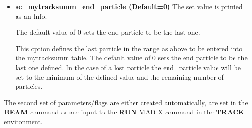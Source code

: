 \begin{itemize}
\item {\bf sc\_mytracksumm\_end\_particle (Default=0)}  The set value
  is printed as an Info.

The default value of 0 sets the end particle to be the last one.

This option defines the last particle in the range as above to be
entered into the mytracksumm table. The default value of 0 sets the
end particle to be the last one defined. In the case of a lost
particle the end\_particle value will be set to the minimum of the
defined value and the remaining number of particles.
\end{itemize}

The second set of parameters/flags are either created automatically,
are set in the {\bf BEAM} command or are input to the {\bf RUN} MAD-X
command in the {\bf TRACK} environment.
